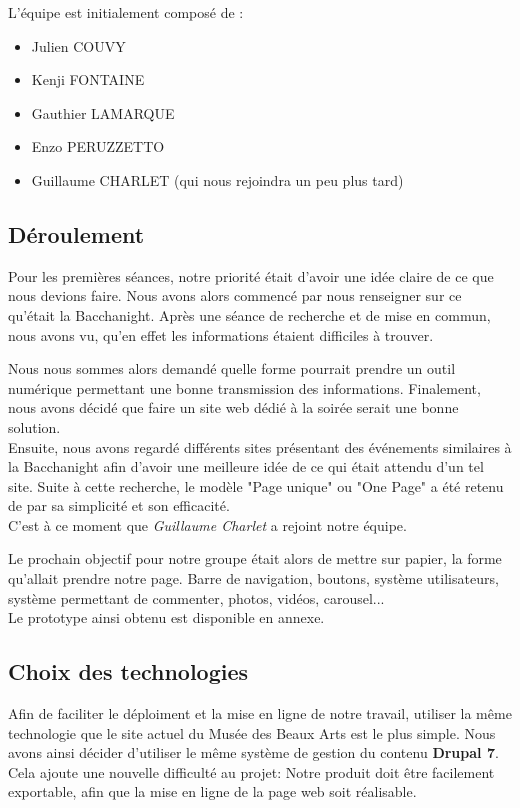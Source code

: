 \documentclass[11pt]{report}
\begin{document}
L'équipe est initialement composé de :
\begin{itemize}
 	\item Julien COUVY
    \item Kenji FONTAINE
    \item Gauthier LAMARQUE
    \item Enzo PERUZZETTO
	\item Guillaume CHARLET (qui nous rejoindra un peu plus tard)
\end{itemize}

\subsection{Déroulement}

Pour les premières séances, notre priorité était d'avoir une idée claire
de ce que nous devions faire. Nous avons alors commencé par nous renseigner sur
ce qu'était la Bacchanight. Après une séance de recherche et de mise en commun,
nous avons vu, qu'en effet les informations étaient difficiles à trouver.
\par
Nous nous sommes alors demandé quelle forme pourrait prendre un outil numérique
permettant une bonne transmission des informations. Finalement, nous avons décidé
que faire un site web dédié à la soirée serait une bonne solution. \\
Ensuite, nous avons regardé différents sites présentant des événements similaires
à la Bacchanight afin d'avoir une meilleure idée de ce qui était attendu d'un
tel site. Suite à cette recherche, le modèle "Page unique" ou "One Page" a été
retenu de par sa simplicité et son efficacité. \\
C'est à ce moment que \textit{Guillaume Charlet} a rejoint notre équipe.
\par
Le prochain objectif pour notre groupe était alors de mettre sur papier,
la forme qu'allait prendre notre page. Barre de navigation, boutons,
système utilisateurs, système permettant de commenter, photos, vidéos, carousel... \\
Le prototype ainsi obtenu est disponible en annexe.

\newpage

\subsection{Choix des technologies}

Afin de faciliter le déploiment et la mise en ligne de notre travail, utiliser la
même technologie que le site actuel du Musée des Beaux Arts est le plus simple.
Nous avons ainsi décider d'utiliser le même système de gestion du contenu
\textbf{Drupal 7}. \\
Cela ajoute une nouvelle difficulté au projet: Notre produit doit être facilement
exportable, afin que la mise en ligne de la page web soit réalisable.
\end{document}
